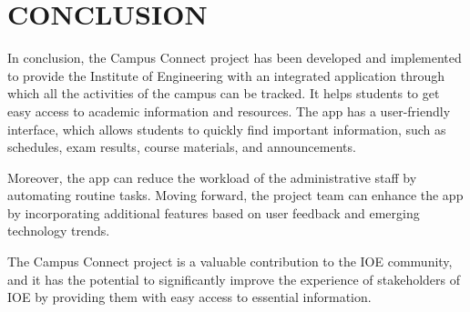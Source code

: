 \chapter{CONCLUSION}

In conclusion, the Campus Connect project has been developed and implemented to provide the Institute of Engineering with an integrated application through which all the activities of the campus can be tracked. It helps students to get easy access to academic information and resources. The app has a user-friendly interface, which allows students to quickly find important information, such as schedules, exam results, course materials, and announcements. 

Moreover, the app can reduce the workload of the administrative staff by automating routine tasks. Moving forward, the project team can enhance the app by incorporating additional features based on user feedback and emerging technology trends. 

The Campus Connect project is a valuable contribution to the IOE community, and it has the potential to significantly improve the experience of stakeholders of IOE by providing them with easy access to essential information.